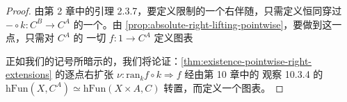 \begin{proof}
由第 2 章中的引理 2.3.7，要定义限制的一个右伴随，只需定义恒同穿过\trFunctor{}
$-\circ k\colon C^{B}\to C^{A}$ 的一个\trAbsoluteRightLifting。由%
\cref{prop:absolute-right-lifting-pointwise}，要做到这一点，只需对 $C^{A}$ 的
一切\trElement{} $f\colon 1\to C^{A}$ 定义\trAbsoluteRightLifting{}图表
\begin{center}
\end{center}
正如我们的记号所暗示的，我们将论证：\cref{thm:existence-pointwise-right-extensions}
的逐点右扩张 $\nu\colon\mathrm{ran}_{k}f\circ k\Rightarrow f$ 经由第 10 章中的
观察 10.3.4 的\trEquivalence{} $\mathrm{hFun}(X,C^{A})\simeq\mathrm{hFun}(X\times A,C)$
转置，而定义一个\trAbsoluteRightLifting{}图表。


\end{proof}
